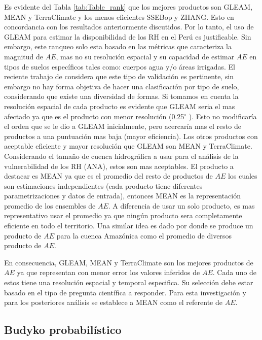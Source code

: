 \documentclass[12pt]{article}
\begin{document}
Es evidente del Tabla \ref{tab:Table_rank} que los mejores productos son GLEAM, MEAN y TerraClimate y los menos eficientes SSEBop y ZHANG. Esto en concordancia con los resultados anteriormente discutidos. Por lo tanto, el uso de GLEAM para estimar la disponibilidad de los RH en el Perú es justificable. Sin embargo, este ranqueo solo esta basado en las métricas que caracteriza la magnitud de $AE$, mas no su resolución espacial y su capacidad de estimar $AE$ en tipos de suelos específicos tales como: cuerpos agua y/o áreas irrigadas. El reciente trabajo de \citet{Weerasinghe2019discuss} considera que este tipo de validación es pertinente, sin embargo no hay forma objetiva de hacer una clasificación por tipo de suelo, considerando que existe una diversidad de formas. Si tomamos en cuenta la resolución espacial de cada producto es evidente que GLEAM seria el mas afectado ya que es el producto con menor resolución (0.25$^{\circ}$ ). Esto no modificaría el orden que se le dio a GLEAM inicialmente, pero acercaría mas el resto de productos a una puntuación mas baja (mayor eficiencia). Los otros productos con aceptable eficiente y mayor resolución que GLEAM son MEAN y TerraClimate. Considerando el tamaño de cuenca hidrográfica a usar para el análisis de la vulnerabilidad de los RH (ANA), estos son mas aceptables. El producto a destacar es MEAN ya que es el promedio del resto de productos de $AE$ los cuales son estimaciones independientes (cada producto tiene diferentes parametrizaciones y datos de entrada), entonces MEAN es la representación promedio de los ensembles de $AE$. A diferencia de usar un solo producto, es mas representativo usar el promedio ya que ningún producto sera completamente eficiente en todo el territorio. Una similar idea es dado por \citet{da2019spatial} donde se produce un producto de $AE$ para la cuenca Amazónica como el promedio de diversos producto de $AE$.

En consecuencia, GLEAM, MEAN y TerraClimate son los mejores productos de $AE$ ya que representan con menor error los valores inferidos de $AE$. Cada uno de estos tiene una resolución espacial y temporal especifica. Su selección debe estar basado en el tipo de pregunta científica a responder. Para esta investigación y para los posteriores análisis se establece a MEAN como el referente de $AE$.

\subsection{Budyko probabilístico}
\end{document}
